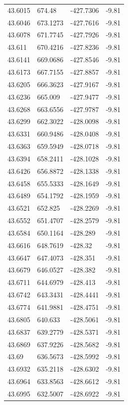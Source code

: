 \begin{table}[H]
\begin{tabular}{llll}
43.6015 & 674.48 & -427.7306 & -9.81 \\
43.6046 & 673.1273 & -427.7616 & -9.81 \\
43.6078 & 671.7745 & -427.7926 & -9.81 \\
43.611 & 670.4216 & -427.8236 & -9.81 \\
43.6141 & 669.0686 & -427.8546 & -9.81 \\
43.6173 & 667.7155 & -427.8857 & -9.81 \\
43.6205 & 666.3623 & -427.9167 & -9.81 \\
43.6236 & 665.009 & -427.9477 & -9.81 \\
43.6268 & 663.6556 & -427.9787 & -9.81 \\
43.6299 & 662.3022 & -428.0098 & -9.81 \\
43.6331 & 660.9486 & -428.0408 & -9.81 \\
43.6363 & 659.5949 & -428.0718 & -9.81 \\
43.6394 & 658.2411 & -428.1028 & -9.81 \\
43.6426 & 656.8872 & -428.1338 & -9.81 \\
43.6458 & 655.5333 & -428.1649 & -9.81 \\
43.6489 & 654.1792 & -428.1959 & -9.81 \\
43.6521 & 652.825 & -428.2269 & -9.81 \\
43.6552 & 651.4707 & -428.2579 & -9.81 \\
43.6584 & 650.1164 & -428.289 & -9.81 \\
43.6616 & 648.7619 & -428.32 & -9.81 \\
43.6647 & 647.4073 & -428.351 & -9.81 \\
43.6679 & 646.0527 & -428.382 & -9.81 \\
43.6711 & 644.6979 & -428.413 & -9.81 \\
43.6742 & 643.3431 & -428.4441 & -9.81 \\
43.6774 & 641.9881 & -428.4751 & -9.81 \\
43.6805 & 640.633 & -428.5061 & -9.81 \\
43.6837 & 639.2779 & -428.5371 & -9.81 \\
43.6869 & 637.9226 & -428.5682 & -9.81 \\
43.69 & 636.5673 & -428.5992 & -9.81 \\
43.6932 & 635.2118 & -428.6302 & -9.81 \\
43.6964 & 633.8563 & -428.6612 & -9.81 \\
43.6995 & 632.5007 & -428.6922 & -9.81 \\

\end{tabular}
\end{table}
